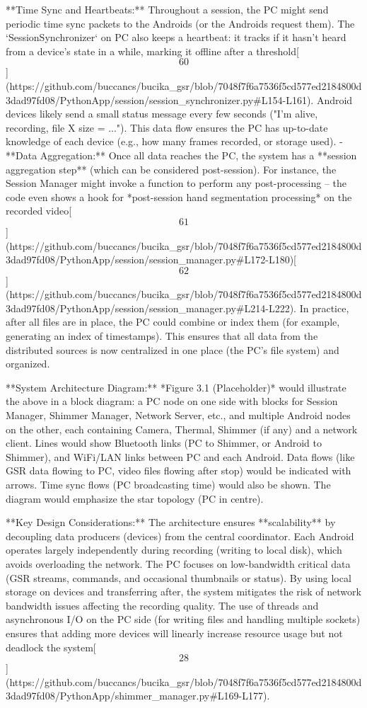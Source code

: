 \documentclass[12pt,a4paper]{article}
\begin{document}
**Time Sync and Heartbeats:** Throughout a session, the PC might send
periodic time sync packets to the Androids (or the Androids request
them). The `SessionSynchronizer` on PC also keeps a heartbeat: it tracks
if it hasn't heard from a device's state in a while, marking it offline
after a
threshold[\[60\]](https://github.com/buccancs/bucika_gsr/blob/7048f7f6a7536f5cd577ed2184800d3dad97fd08/PythonApp/session/session_synchronizer.py#L154-L161).
Android devices likely send a small status message every few seconds
("I'm alive, recording, file X size = ..."). This data flow ensures the
PC has up-to-date knowledge of each device (e.g., how many frames
recorded, or storage used). - **Data Aggregation:** Once all data
reaches the PC, the system has a **session aggregation step** (which can
be considered post-session). For instance, the Session Manager might
invoke a function to perform any post-processing -- the code even shows
a hook for *post-session hand segmentation processing* on the recorded
video[\[61\]](https://github.com/buccancs/bucika_gsr/blob/7048f7f6a7536f5cd577ed2184800d3dad97fd08/PythonApp/session/session_manager.py#L172-L180)[\[62\]](https://github.com/buccancs/bucika_gsr/blob/7048f7f6a7536f5cd577ed2184800d3dad97fd08/PythonApp/session/session_manager.py#L214-L222).
In practice, after all files are in place, the PC could combine or index
them (for example, generating an index of timestamps). This ensures that
all data from the distributed sources is now centralized in one place
(the PC's file system) and organized.

**System Architecture Diagram:** *Figure 3.1 (Placeholder)* would
illustrate the above in a block diagram: a PC node on one side with
blocks for Session Manager, Shimmer Manager, Network Server, etc., and
multiple Android nodes on the other, each containing Camera, Thermal,
Shimmer (if any) and a network client. Lines would show Bluetooth links
(PC to Shimmer, or Android to Shimmer), and WiFi/LAN links between PC
and each Android. Data flows (like GSR data flowing to PC, video files
flowing after stop) would be indicated with arrows. Time sync flows (PC
broadcasting time) would also be shown. The diagram would emphasize the
star topology (PC in centre).

**Key Design Considerations:** The architecture ensures **scalability**
by decoupling data producers (devices) from the central coordinator.
Each Android operates largely independently during recording (writing to
local disk), which avoids overloading the network. The PC focuses on
low-bandwidth critical data (GSR streams, commands, and occasional
thumbnails or status). By using local storage on devices and
transferring after, the system mitigates the risk of network bandwidth
issues affecting the recording quality. The use of threads and
asynchronous I/O on the PC side (for writing files and handling multiple
sockets) ensures that adding more devices will linearly increase
resource usage but not deadlock the
system[\[28\]](https://github.com/buccancs/bucika_gsr/blob/7048f7f6a7536f5cd577ed2184800d3dad97fd08/PythonApp/shimmer_manager.py#L169-L177).
\end{document}
